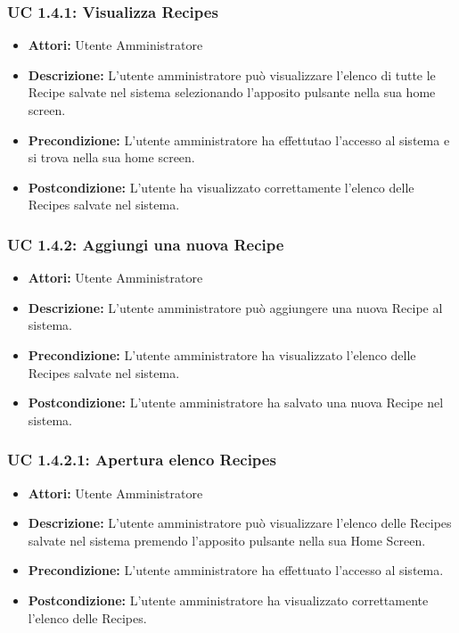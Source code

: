 \subsubsection{UC 1.4.1: Visualizza Recipes}

\begin{itemize}
\item \textbf{Attori:} Utente Amministratore
\item \textbf{Descrizione:} L'utente amministratore può visualizzare l'elenco di tutte le Recipe salvate nel sistema selezionando l'apposito pulsante nella sua home screen.
\item \textbf{Precondizione:} L'utente amministratore ha effettutao l'accesso al sistema e si trova nella sua home screen.
\item \textbf{Postcondizione:} L'utente ha visualizzato correttamente l'elenco delle Recipes salvate nel sistema.
\end{itemize}

\subsubsection{UC 1.4.2: Aggiungi una nuova Recipe}

\begin{itemize}
\item \textbf{Attori:} Utente Amministratore
\item \textbf{Descrizione:} L'utente amministratore può aggiungere una nuova Recipe al sistema.
\item \textbf{Precondizione:} L'utente amministratore ha visualizzato l'elenco delle Recipes salvate nel sistema.
\item \textbf{Postcondizione:} L'utente amministratore ha salvato una nuova Recipe nel sistema.
\end{itemize}

\subsubsection{UC 1.4.2.1: Apertura elenco Recipes}

\begin{itemize}
\item \textbf{Attori:} Utente Amministratore
\item \textbf{Descrizione:} L'utente amministratore può visualizzare l'elenco delle Recipes salvate nel sistema premendo l'apposito pulsante nella sua Home Screen.
\item \textbf{Precondizione:} L'utente amministratore ha effettuato l'accesso al sistema.
\item \textbf{Postcondizione:} L'utente amministratore ha visualizzato correttamente l'elenco delle Recipes.
\end{itemize}

